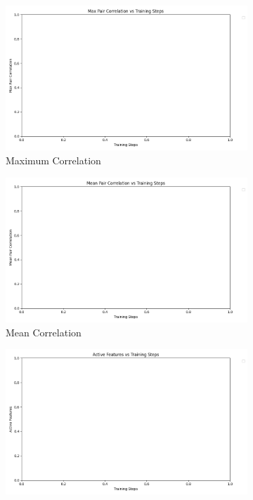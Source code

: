 \documentclass{article} %
\begin{document}
\begin{figure}[h]
    \centering
    \begin{subfigure}{0.32\textwidth}
        \includegraphics[width=\textwidth]{max_pair_correlation_comparison.png}
        \caption{Maximum Correlation}
        \label{fig:max_corr}
    \end{subfigure}
    \hfill
    \begin{subfigure}{0.32\textwidth}
        \includegraphics[width=\textwidth]{mean_pair_correlation_comparison.png}
        \caption{Mean Correlation}
        \label{fig:mean_corr}
    \end{subfigure}
    \hfill
    \begin{subfigure}{0.32\textwidth}
        \includegraphics[width=\textwidth]{active_features_comparison.png}

\end{subfigure}
\end{figure}
\end{document}
